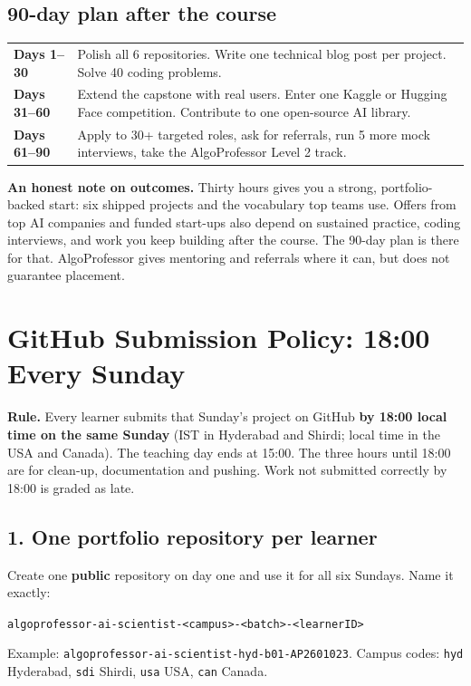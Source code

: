 \documentclass[11pt,a4paper]{article}
\begin{document}
\subsection*{90-day plan after the course}
\begin{tabularx}{\linewidth}{@{}L{2.4cm} Y@{}}
\toprule
\sffamily\bfseries Days 1--30 & Polish all 6 repositories. Write one technical blog post per project. Solve 40 coding problems.\\
\sffamily\bfseries Days 31--60 & Extend the capstone with real users. Enter one Kaggle or Hugging Face competition. Contribute to one open-source AI library.\\
\sffamily\bfseries Days 61--90 & Apply to 30+ targeted roles, ask for referrals, run 5 more mock interviews, take the AlgoProfessor Level 2 track.\\
\bottomrule
\end{tabularx}

\begin{navynote}
\textbf{\color{gold}An honest note on outcomes.} Thirty hours gives you a strong, portfolio-backed start: six shipped projects and the vocabulary top teams use. Offers from top AI companies and funded start-ups also depend on sustained practice, coding interviews, and work you keep building after the course. The 90-day plan is there for that. AlgoProfessor gives mentoring and referrals where it can, but does not guarantee placement.
\end{navynote}


\section{GitHub Submission Policy: 18:00 Every Sunday}
\begin{navynote}
\textbf{\color{gold}Rule.} Every learner submits that Sunday's project on GitHub \textbf{by 18:00 local time on the same Sunday} (IST in Hyderabad and Shirdi; local time in the USA and Canada). The teaching day ends at 15:00. The three hours until 18:00 are for clean-up, documentation and pushing. Work not submitted correctly by 18:00 is graded as late.
\end{navynote}

\subsection*{1. One portfolio repository per learner}
Create one \textbf{public} repository on day one and use it for all six Sundays. Name it exactly:
\begin{center}\texttt{\large algoprofessor-ai-scientist-<campus>-<batch>-<learnerID>}\end{center}
Example: \texttt{algoprofessor-ai-scientist-hyd-b01-AP2601023}. Campus codes: \texttt{hyd} Hyderabad, \texttt{sdi} Shirdi, \texttt{usa} USA, \texttt{can} Canada.
\end{document}
